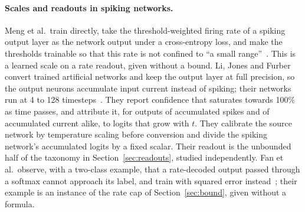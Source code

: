 \documentclass[10pt]{article}
\begin{document}
\paragraph{Scales and readouts in spiking networks.}
Meng et al.\ train directly, take the threshold-weighted firing rate of a spiking output layer
as the network output under a cross-entropy loss, and make the thresholds trainable so that this
rate is not confined to ``a small range''~\citep{meng2022dsr}. This is a learned scale on a rate %
readout, given without a bound. Li, Jones and Furber convert trained artificial networks and
keep the output layer at full precision, so the output neurons accumulate input current instead
of spiking; their networks run at 4 to 128 timesteps~\citep{li2023dynamic}. They report %
confidence that saturates towards 100\% as time passes, and attribute it, for outputs of
accumulated spikes and of accumulated current alike, to logits that grow with $t$. They calibrate the source network by
temperature scaling before conversion and divide the spiking network's accumulated logits by a
fixed scalar. Their readout is the unbounded %
half of the taxonomy in Section~\ref{sec:readouts}, studied independently. Fan et al.\ observe,
with a two-class example, that a rate-decoded output passed through a softmax cannot approach its
label, and train with squared error instead~\citep{fan2024sfod}; their example is an instance of %
the rate cap of Section~\ref{sec:bound}, given without a formula.
\end{document}
